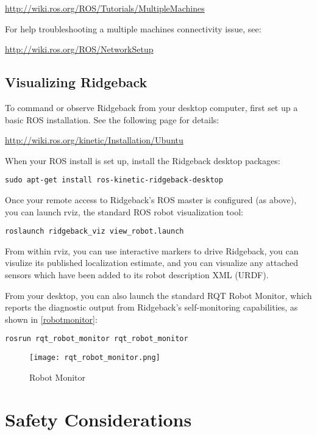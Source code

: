 \documentclass[]{clearpath-latex/clearpath-manual}
\begin{document}
\url{http://wiki.ros.org/ROS/Tutorials/MultipleMachines}

For help troubleshooting a multiple machines connectivity issue, see:

\url{http://wiki.ros.org/ROS/NetworkSetup}

\subsection{Visualizing Ridgeback}

To command or observe Ridgeback from your desktop computer, first set up a basic ROS installation.  See the following page for details:

\url{http://wiki.ros.org/kinetic/Installation/Ubuntu}

When your ROS install is set up, install the Ridgeback desktop packages:

\begin{lstlisting}
sudo apt-get install ros-kinetic-ridgeback-desktop
\end{lstlisting}

Once your remote access to Ridgeback's ROS master is configured (as above), you can launch rviz, the standard ROS robot visualization tool:

\begin{lstlisting}
roslaunch ridgeback_viz view_robot.launch
\end{lstlisting}

From within rviz, you can use interactive markers to drive Ridgeback, you can visulize its published localization estimate, and you can visualize any attached sensors which have been added to its robot description XML (URDF).

\pagebreak[4]

From your desktop, you can also launch the standard RQT Robot Monitor, which reports the diagnostic output from Ridgeback's self-monitoring capabilities, as shown in \autoref{robotmonitor}:

\begin{lstlisting}
rosrun rqt_robot_monitor rqt_robot_monitor
\end{lstlisting}

\begin{figure}[!htb]
  \centering
  \texttt{[image: rqt\_robot\_monitor.png]}
  \caption{Robot Monitor}
  \label{robotmonitor}
\end{figure}


\section{Safety Considerations}
\end{document}
